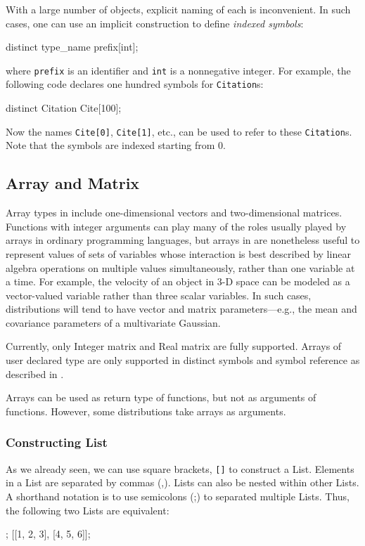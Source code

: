 \documentclass[12pt]{article}
\begin{document}
With a large number of objects, explicit naming of each is inconvenient.
In such cases, one can use an implicit construction to define {\em indexed symbols}:
\begin{blogcode}
distinct type_name prefix[int];
\end{blogcode}
where {\tt prefix} is an identifier and {\tt int} is a nonnegative integer.
For example, the following \bl code declares one hundred symbols for {\tt Citation}s:
\begin{blogcode}
distinct Citation Cite[100];
\end{blogcode}
Now the names \verb|Cite[0]|, \verb|Cite[1]|, etc., can be used to refer to these {\tt Citation}s. Note that the symbols are indexed starting from 0.

\subsection{Array and Matrix}\label{array-section}

Array types in \bl include one-dimensional vectors and two-dimensional
matrices. Functions with integer arguments can play many of the roles
usually played by arrays in ordinary programming languages, but arrays in
\bl are nonetheless useful to represent values of sets of variables
whose interaction is best described by linear algebra operations on
multiple values simultaneously, rather than one variable at a time.
For example, the velocity of an object in 3-D space can be modeled
as a vector-valued variable rather than three scalar variables.
In such cases, distributions will tend to have vector and matrix
parameters---e.g., the mean and covariance parameters of a
multivariate Gaussian.

Currently, only Integer matrix and Real matrix are fully
supported. Arrays of user declared type are only supported in distinct symbols and symbol reference as described in .

Arrays can be used as return type of functions, but not as arguments of functions. However, some distributions take arrays as arguments.

\subsubsection{Constructing List}\label{list-literal-section}
As we already seen, we can use square brackets, \texttt{[]} to construct a List. Elements in a List are separated by commas (,). Lists can also be nested within other Lists. A shorthand notation is to use semicolons (;) to separated multiple Lists.
Thus, the following two Lists are equivalent:
\begin{blogcode}
[1, 2, 3; 4, 5, 6];
[[1, 2, 3], [4, 5, 6]];
\end{blogcode}
\end{document}
